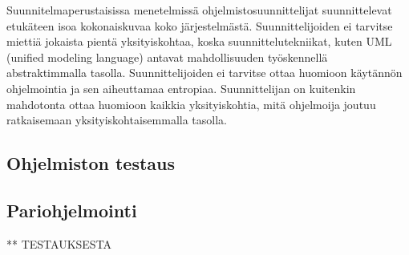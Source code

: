 \documentclass[finnish]{tktltiki2}
\theoremstyle{definition}
\theoremstyle{remark}
\begin{document}
Suunnitelmaperustaisissa menetelmissä ohjelmistosuunnittelijat suunnittelevat etukäteen isoa kokonaiskuvaa koko järjestelmästä. Suunnittelijoiden ei tarvitse miettiä jokaista pientä yksityiskohtaa, koska suunnittelutekniikat, kuten UML (unified modeling language) antavat mahdollisuuden työskennellä abstraktimmalla tasolla. Suunnittelijoiden ei tarvitse ottaa huomioon käytännön ohjelmointia ja sen aiheuttamaa entropiaa. Suunnittelijan on kuitenkin mahdotonta ottaa huomioon kaikkia yksityiskohtia, mitä ohjelmoija joutuu ratkaisemaan yksityiskohtaisemmalla tasolla\cite{FOW01b}.

\subsection{Ohjelmiston testaus}

\subsection{Pariohjelmointi}


** TESTAUKSESTA
%
%
% 
%



\end{document}
